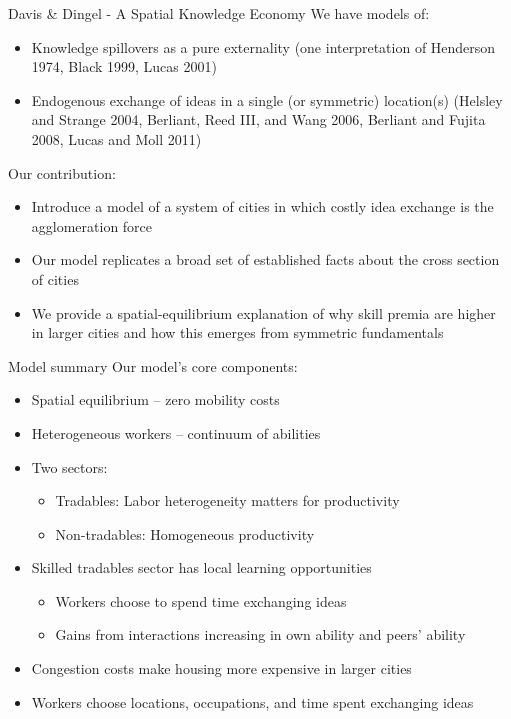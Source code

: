 \documentclass[10pt,notes=hide]{beamer}
\begin{document}
\begin{frame}{ Davis \& Dingel - A Spatial Knowledge Economy}
We have models of: 
\begin{itemize}
	\item Knowledge spillovers as a pure externality (one interpretation of Henderson 1974, Black 1999, Lucas 2001)
	\item Endogenous exchange of ideas in a single (or symmetric) location(s) (Helsley and Strange 2004, Berliant, Reed III, and Wang 2006, Berliant and Fujita 2008, Lucas and Moll 2011)
\end{itemize}
Our contribution:
\begin{itemize}
	\item Introduce a model of a system of cities in which costly idea exchange is the agglomeration force 
	\item Our model replicates a broad set of established facts about the cross section of cities
	\item We provide a spatial-equilibrium explanation of why skill premia are higher in larger cities and how this emerges from symmetric fundamentals
\end{itemize}
\end{frame}
\begin{frame}{Model summary}
Our model's core components: 
\begin{itemize}
\item Spatial equilibrium -- zero mobility costs 
\item Heterogeneous workers -- continuum of abilities 
\item Two sectors: 
\begin{itemize}
	\item Tradables: Labor heterogeneity matters for productivity
	\item Non-tradables: Homogeneous productivity
\end{itemize}
\item Skilled tradables sector has local learning opportunities 
\begin{itemize}
	\item Workers choose to spend time exchanging ideas 
	\item Gains from interactions increasing in own ability and peers' ability
\end{itemize}
\item Congestion costs make housing more expensive in larger cities 
\item Workers choose locations, occupations, and time spent exchanging ideas 
\end{itemize}
\end{frame}
\end{document}
